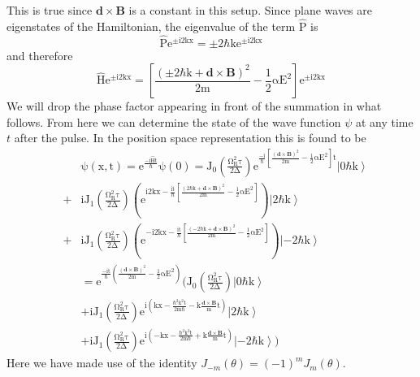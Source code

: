 \documentclass[twocolumn,english,pra,aps,superscriptaddress,floatfix]{revtex4-1}
\begin{document}
This is true since $\mathbf{d}\times\mathbf{B}$ is a constant in this setup.  Since plane waves are eigenstates of the Hamiltonian, the eigenvalue of the term $\mathrm{\hat{P}}$ is
\begin{equation}
\mathrm{\hat{P} e^{\pm i2kx}=\pm2\hbar k e^{\pm i2kx}}
\end{equation}
and therefore
\begin{equation}
\mathrm{\hat{H} e^{\pm i2kx}=\left[\frac{\left(\pm 2\hbar k+\mathbf{d}\times\mathbf{B}\right)^2}{2m}-\frac{1}{2}\alpha E^2\right]e^{\pm i2kx}}
\end{equation}
We will drop the phase factor appearing in front of the summation in what follows. From here we can determine the state of the wave function $\psi$ at any time $t$ after the pulse.  In the position space representation this is found to be \cite{pritchard}
\begin{eqnarray}
&&\mathrm{\psi(x,t)=e^{\frac{-i\hat{H}t}{\hbar}}\psi(0)=J_0\left(\frac{\Omega_R^2\tau}{2\Delta}\right)e^{\frac{-i}{\hbar}\left[\frac{\left(\mathbf{d}\times\mathbf{B}\right)^2}{2m}-\frac{1}{2}\alpha E^2\right]t}\left|0\hbar k\right>} \nonumber \\
&+&\mathrm{iJ_1\left(\frac{\Omega_R^2\tau}{2\Delta}\right)\left(e^{i2kx-\frac{it}{\hbar}\left[\frac{\left( 2\hbar k+\mathbf{d}\times\mathbf{B}\right)^2}{2m}-\frac{1}{2}\alpha E^2\right]}\right)\left|2\hbar k\right>} \nonumber \\
&+&\mathrm{iJ_1\left(\frac{\Omega_R^2\tau}{2\Delta}\right)\left(e^{-i2kx-\frac{it}{\hbar}\left[\frac{\left(-2\hbar k+\mathbf{d}\times\mathbf{B}\right)^2}{2m}-\frac{1}{2}\alpha E^2\right]}\right)\left|-2\hbar k\right>} \nonumber \\
&&=\mathrm{e^{\frac{-it}{\hbar}\left(\frac{\left(\mathbf{d}\times\mathbf{B}\right)^2}{2m}-\frac{1}{2}\alpha E^2\right)}\bigg(J_0\left(\frac{\Omega_R^2\tau}{2\Delta}\right)\left|0\hbar k\right>}\nonumber \\
&&+\mathrm{iJ_1\left(\frac{\Omega_R^2\tau}{2\Delta}\right)e^{i\left(kx-\frac{\hbar^2k^2t}{2m\hbar}-k\frac{\mathbf{d}\times\mathbf{B}}{m}t\right)}\left|2\hbar k\right>}\nonumber \\
&&+\mathrm{iJ_1\left(\frac{\Omega_R^2\tau}{2\Delta}\right)e^{i\left(-kx-\frac{\hbar^2k^2t}{2m\hbar}+k\frac{\mathbf{d}\times\mathbf{B}}{m}t\right)}\left|-2\hbar k\right>\bigg)}
\end{eqnarray}
Here we have made use of the identity $J_{-m}(\theta)=(-1)^mJ_{m}(\theta)$.  
\end{document}
